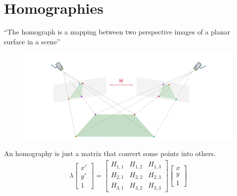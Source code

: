 \section{Homographies}

\begin{frame}{\secname}
    ``The homograph is a mapping between two perspective images of a planar surface in a scene'' \cite{gledhill_panoramic_2003}
    \begin{figure}
        \centering
        \includegraphics[width=\textwidth]{img/homog}
    \end{figure}
\end{frame}

\begin{frame}{\secname}
    An homography is just a matrix that convert some points into others.
    \begin{gather*}
        \lambda
        \begin{bmatrix}
            x' \\ y' \\ 1
        \end{bmatrix} = 
        \begin{bmatrix}
            H_{1,1} & H_{1,2} & H_{1,3} \\
            H_{2,1} & H_{2,2} & H_{2,3} \\
            H_{3,1} & H_{3,2} & H_{3,3}
        \end{bmatrix}
        \begin{bmatrix}
            x \\ y \\ 1
        \end{bmatrix}
    \end{gather*}    
\end{frame}


